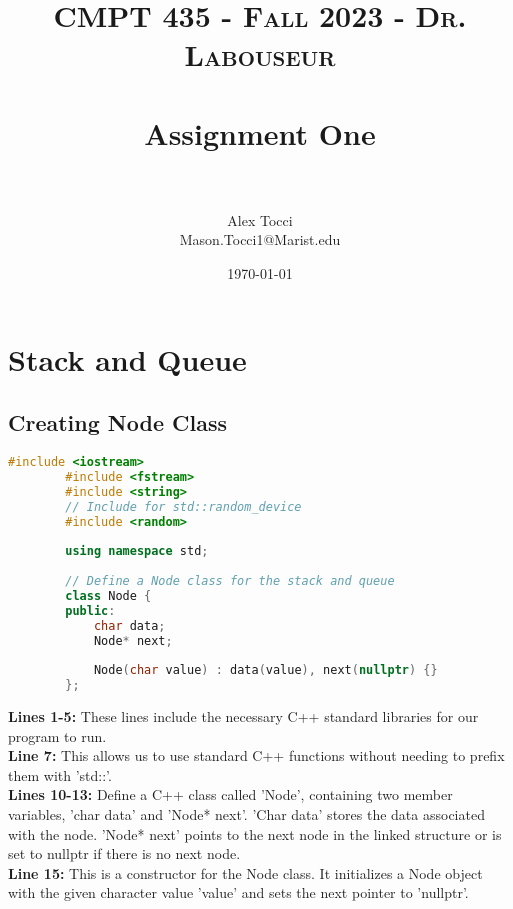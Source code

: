 \documentclass[letterpaper, 10pt,DIV=13]{scrartcl}
\title{	
   \normalfont \normalsize 
   \textsc{CMPT 435 - Fall 2023 - Dr. Labouseur} \\[10pt] %
   \horrule{0.5pt} \\[0.25cm] 	%
   \huge Assignment One  \\     	    %
   \horrule{0.5pt} \\[0.25cm] 	%
}
\author{Alex Tocci \\ \normalsize Mason.Tocci1@Marist.edu}
\date{\normalsize\today} 	%
\numberwithin{equation}{section} %
\numberwithin{figure}{section} %
\numberwithin{table}{section} %
\begin{document}
\maketitle %

\section{Stack and Queue}

\subsection{Creating Node Class}
\begin{linenumbers}
\begin{lstlisting}[language=C++, caption={Node Class}, label={code:example}]
        #include <iostream>
        #include <fstream>
        #include <string>
        // Include for std::random_device
        #include <random>
        
        using namespace std;
        
        // Define a Node class for the stack and queue
        class Node {
        public:
            char data;
            Node* next;
        
            Node(char value) : data(value), next(nullptr) {}
        };
\end{lstlisting}
\end{linenumbers}
\nolinenumbers

\textbf{Lines 1-5:} These lines include the necessary C++ standard libraries for our program to run. \\
\textbf{Line 7:} This allows us to use standard C++ functions without needing to prefix them with 'std::'. \\
\textbf{Lines 10-13:} Define a C++ class called 'Node', containing two member variables, 'char data' and 'Node* next'. 'Char data' stores the data associated with the node. 'Node* next' points to the next node in the linked structure or is set to nullptr if there is no next node. \\
\textbf{Line 15:} This is a constructor for the Node class. It initializes a Node object with the given character value 'value' and sets the next pointer to 'nullptr'.
\end{document}
